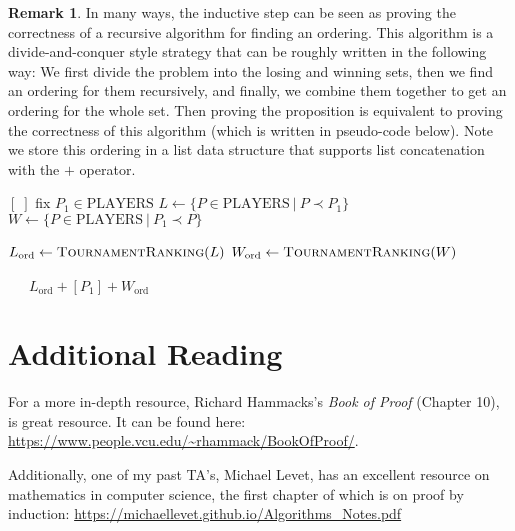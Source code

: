 \documentclass{article}
\theoremstyle{plain}
\theoremstyle{definition}
\newtheorem{remark}{Remark}
\begin{document}
\begin{remark}
    In many ways, the inductive step can be seen as proving the correctness of a recursive algorithm for finding an ordering. This algorithm is a divide-and-conquer style strategy that can be roughly written in the following way: We first divide the problem into the losing and winning sets, then we find an ordering for them recursively, and finally, we combine them together to get an ordering for the whole set. Then proving the proposition is equivalent to proving the correctness of this algorithm (which is written in pseudo-code below). Note we store this ordering in a list data structure that supports list concatenation with the \(+\) operator.
    \begin{center}
    \begin{minipage}{.5\linewidth}
    \begin{algorithmic}[1]
                \Return \([\;]\)
            \Else
                \State fix \(P_1 \in \text{PLAYERS}\)
                \State \(L \leftarrow \{P \in \text{PLAYERS}\ |\ P \prec P_1\}\)
                \State \(W \leftarrow \{P \in \text{PLAYERS}\ |\ P_1 \prec P\}\)

                \State \(L_{\text{ord}} \leftarrow \textsc{TournamentRanking}(L)\)
                \State \(W_{\text{ord}} \leftarrow \textsc{TournamentRanking}(W)\)

                \ \ \ \Return \(L_{\text{ord}} + [P_1] + W_{\text{ord}}\)
            \EndIf 
        \EndProcedure
    \end{algorithmic}
    \end{minipage}
    \end{center}
\end{remark}

\section{Additional Reading}

For a more in-depth resource, Richard Hammacks's \emph{Book of Proof} (Chapter 10), is great resource. It can be found here: \url{https://www.people.vcu.edu/~rhammack/BookOfProof/}.

Additionally, one of my past TA's, Michael Levet, has an excellent resource on mathematics in computer science, the first chapter of which is on proof by induction: \url{https://michaellevet.github.io/Algorithms_Notes.pdf}
\end{document}
